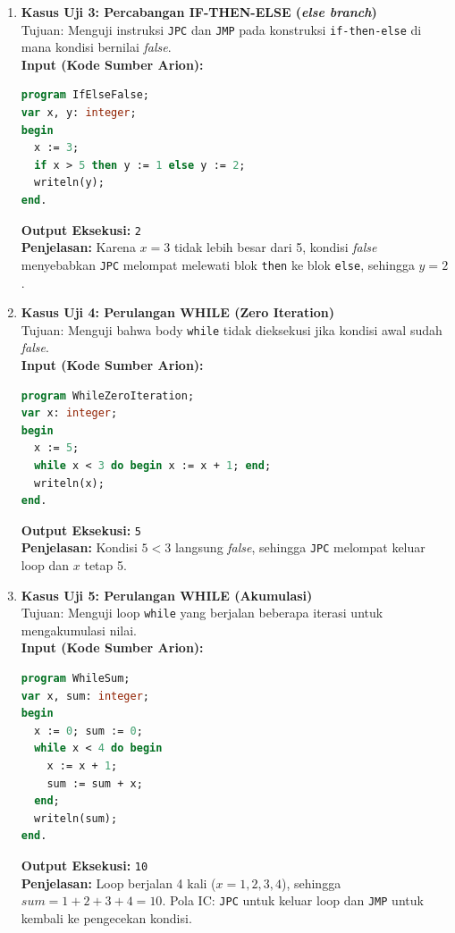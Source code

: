 \documentclass[12pt, a4paper]{article}
\begin{document}
\begin{enumerate}
    \item \textbf{Kasus Uji 3: Percabangan IF-THEN-ELSE (\textit{else branch})} \\
    Tujuan: Menguji instruksi \texttt{JPC} dan \texttt{JMP} pada konstruksi \texttt{if-then-else} di mana kondisi bernilai \textit{false}. \\
    \vspace{0.2cm}
    \textbf{Input (Kode Sumber Arion):}
\begin{lstlisting}[language=Pascal]
program IfElseFalse;
var x, y: integer;
begin
  x := 3;
  if x > 5 then y := 1 else y := 2;
  writeln(y);
end.
\end{lstlisting}
    \textbf{Output Eksekusi:} \texttt{2} \\
    \textbf{Penjelasan:} Karena $x = 3$ tidak lebih besar dari 5, kondisi \textit{false} menyebabkan \texttt{JPC} melompat melewati blok \texttt{then} ke blok \texttt{else}, sehingga $y = 2$.
    \vspace{0.5cm}

    \item \textbf{Kasus Uji 4: Perulangan WHILE (Zero Iteration)} \\
    Tujuan: Menguji bahwa body \texttt{while} tidak dieksekusi jika kondisi awal sudah \textit{false}. \\
    \vspace{0.2cm}
    \textbf{Input (Kode Sumber Arion):}
\begin{lstlisting}[language=Pascal]
program WhileZeroIteration;
var x: integer;
begin
  x := 5;
  while x < 3 do begin x := x + 1; end;
  writeln(x);
end.
\end{lstlisting}
    \textbf{Output Eksekusi:} \texttt{5} \\
    \textbf{Penjelasan:} Kondisi $5 < 3$ langsung \textit{false}, sehingga \texttt{JPC} melompat keluar loop dan $x$ tetap 5.
    \vspace{0.5cm}

    \item \textbf{Kasus Uji 5: Perulangan WHILE (Akumulasi)} \\
    Tujuan: Menguji loop \texttt{while} yang berjalan beberapa iterasi untuk mengakumulasi nilai. \\
    \vspace{0.2cm}
    \textbf{Input (Kode Sumber Arion):}
\begin{lstlisting}[language=Pascal]
program WhileSum;
var x, sum: integer;
begin
  x := 0; sum := 0;
  while x < 4 do begin
    x := x + 1;
    sum := sum + x;
  end;
  writeln(sum);
end.
\end{lstlisting}
    \textbf{Output Eksekusi:} \texttt{10} \\
    \textbf{Penjelasan:} Loop berjalan 4 kali ($x = 1, 2, 3, 4$), sehingga $sum = 1+2+3+4 = 10$. Pola IC: \texttt{JPC} untuk keluar loop dan \texttt{JMP} untuk kembali ke pengecekan kondisi.
    \vspace{0.5cm}


\end{enumerate}
\end{document}
